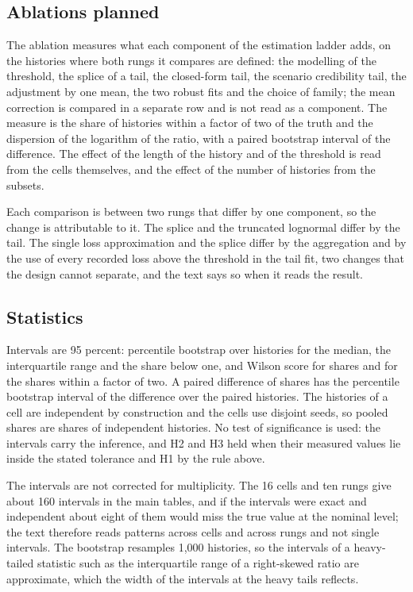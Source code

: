 \subsection{Ablations planned}
\label{sec:ed-ablations}

The ablation measures what each component of the estimation ladder adds, on the histories where both rungs it compares are defined: the modelling of the threshold, the splice of a tail, the closed-form tail, the scenario credibility tail, the adjustment by one mean, the two robust fits and the choice of family; the mean correction is compared in a separate row and is not read as a component. The measure is the share of histories within a factor of two of the truth and the dispersion of the logarithm of the ratio, with a paired bootstrap interval of the difference. The effect of the length of the history and of the threshold is read from the cells themselves, and the effect of the number of histories from the subsets.

Each comparison is between two rungs that differ by one component, so the change is attributable to it. The splice and the truncated lognormal differ by the tail. The single loss approximation and the splice differ by the aggregation and by the use of every recorded loss above the threshold in the tail fit, two changes that the design cannot separate, and the text says so when it reads the result.

\subsection{Statistics}
\label{sec:ed-statistics}

Intervals are 95 percent: percentile bootstrap over histories for the median, the interquartile range and the share below one, and Wilson score for shares and for the shares within a factor of two. A paired difference of shares has the percentile bootstrap interval of the difference over the paired histories. The histories of a cell are independent by construction and the cells use disjoint seeds, so pooled shares are shares of independent histories. No test of significance is used: the intervals carry the inference, and H2 and H3 held when their measured values lie inside the stated tolerance and H1 by the rule above.

The intervals are not corrected for multiplicity. The 16 cells and ten rungs give about 160 intervals in the main tables, and if the intervals were exact and independent about eight of them would miss the true value at the nominal level; the text therefore reads patterns across cells and across rungs and not single intervals. The bootstrap resamples 1{,}000 histories, so the intervals of a heavy-tailed statistic such as the interquartile range of a right-skewed ratio are approximate, which the width of the intervals at the heavy tails reflects.
